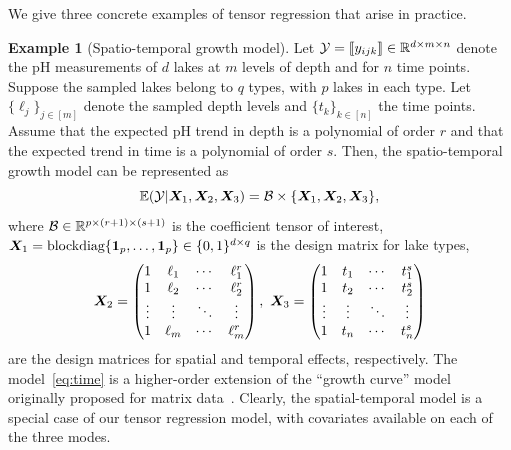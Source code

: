\documentclass[12pt]{article}
\theoremstyle{plain}
\theoremstyle{definition}
\newtheorem{example}{Example}
\begin{document}
We give three concrete examples of tensor regression that arise in practice. 
\begin{example}[Spatio-temporal growth model]
Let $\mathcal{Y}=\llbracket y_{ijk} \rrbracket\in\mathbb{R}^{d \times m\times n}$ denote the pH measurements of $d$ lakes at $m$ levels of depth and for $n$ time points. Suppose the sampled lakes belong to $q$ types, with $p$ lakes in each type. Let $\{\ell_j\}_{j\in[m]}$ denote the sampled depth levels and $\{t_k\}_{k\in[n]}$ the time points. Assume that the expected pH trend in depth is a polynomial of order $r$ and that the expected trend in time is a polynomial of order $s$. Then, the spatio-temporal growth model can be represented as
\begin{equation}\label{eq:time}
\mathbb{E}(\mathcal{Y}|\bm X_1,\bm X_2,\bm X_3)=\mathcal{B}\times\{\bm X_1,\bm X_2,\bm X_3\},
\end{equation}
where $\mathcal{B}\in\mathbb{R}^{p\times (r+1)\times (s+1)}$ is the coefficient tensor of interest, $\bm X_1=\text{blockdiag}\{\mathbf{1}_p,\ldots,\mathbf{1}_p\}\in \{0,1\}^{d\times q}$ is the design matrix for lake types, 
\[
\bm X_2=
\begin{pmatrix}
1 & \ell_1&\cdots &\ell^{r}_1\\
1 & \ell_2&\cdots &\ell^{r}_2\\
\vdots &\vdots&\ddots&\vdots\\
1&\ell_{m}&\cdots&\ell^{r}_{m}
\end{pmatrix},\
\bm X_3=
\begin{pmatrix}
1 & t_1&\cdots &t^{s}_1\\
1 & t_2&\cdots &t^{s}_2\\
\vdots &\vdots&\ddots&\vdots\\
1&t_{n}&\cdots&t^{s}_{n}
\end{pmatrix}
\]
are the design matrices for spatial and temporal effects, respectively. The model~\eqref{eq:time} is a higher-order extension of the ``growth curve'' model originally proposed for matrix data~\citep{gabriel1998generalised,potthoff1964generalized,srivastava2008models}. Clearly, the spatial-temporal model is a special case of our tensor regression model, with covariates available on each of the three modes.
\end{example}
\end{document}
